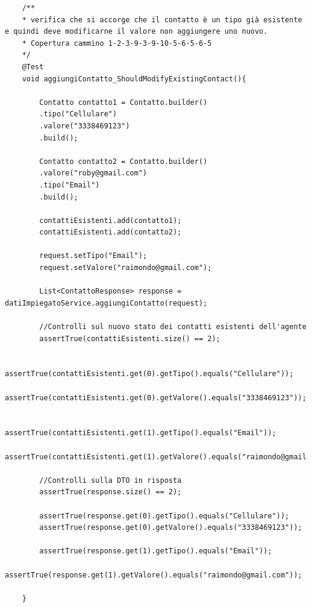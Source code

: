 \begin{lstlisting}
	/**
	* verifica che si accorge che il contatto è un tipo già esistente e quindi deve modificarne il valore non aggiungere uno nuovo.
	* Copertura cammino 1-2-3-9-3-9-10-5-6-5-6-5
	*/
	@Test
	void aggiungiContatto_ShouldModifyExistingContact(){
		
		Contatto contatto1 = Contatto.builder()
		.tipo("Cellulare")
		.valore("3338469123")
		.build();
		
		Contatto contatto2 = Contatto.builder()
		.valore("roby@gmail.com")
		.tipo("Email")
		.build();
		
		contattiEsistenti.add(contatto1);
		contattiEsistenti.add(contatto2);
		
		request.setTipo("Email");
		request.setValore("raimondo@gmail.com");
		
		List<ContattoResponse> response = datiImpiegatoService.aggiungiContatto(request);
		
		//Controlli sul nuovo stato dei contatti esistenti dell'agente
		assertTrue(contattiEsistenti.size() == 2);
		
		assertTrue(contattiEsistenti.get(0).getTipo().equals("Cellulare"));
		assertTrue(contattiEsistenti.get(0).getValore().equals("3338469123"));
		
		assertTrue(contattiEsistenti.get(1).getTipo().equals("Email"));
		assertTrue(contattiEsistenti.get(1).getValore().equals("raimondo@gmail.com"));
		
		//Controlli sulla DTO in risposta
		assertTrue(response.size() == 2);
		
		assertTrue(response.get(0).getTipo().equals("Cellulare"));
		assertTrue(response.get(0).getValore().equals("3338469123"));
		
		assertTrue(response.get(1).getTipo().equals("Email"));
		assertTrue(response.get(1).getValore().equals("raimondo@gmail.com"));
		
	}
\end{lstlisting}

